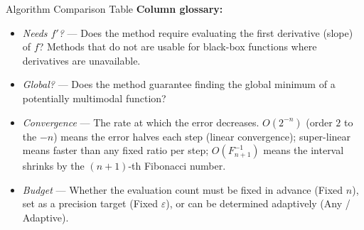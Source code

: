 \documentclass[aspectratio=169,10pt]{beamer}
\begin{document}
\begin{frame}[allowframebreaks]{Algorithm Comparison Table}
  \smallskip
  \textbf{Column glossary:}
  \begin{itemize}
    \item \emph{Needs $f'$?} --- Does the method require evaluating the
          first derivative (slope) of $f$?  Methods that do not are usable
          for black-box functions where derivatives are unavailable.
    \item \emph{Global?} --- Does the method guarantee finding the global
          minimum of a potentially multimodal function?
    \item \emph{Convergence} --- The rate at which the error decreases.
          $O(2^{-n})$ (order $2$ to the $-n$) means the error halves each
          step (linear convergence); super-linear means faster than any
          fixed ratio per step; $O(F_{n+1}^{-1})$ means the interval
          shrinks by the $(n+1)$-th Fibonacci number.
    \item \emph{Budget} --- Whether the evaluation count must be fixed in
          advance (Fixed $n$), set as a precision target (Fixed $\varepsilon$),
          or can be determined adaptively (Any / Adaptive).
  \end{itemize}

\end{frame}
\end{document}
